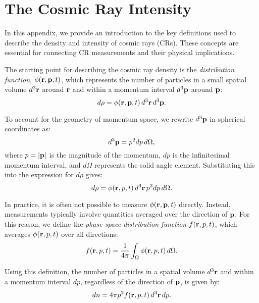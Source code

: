 \section{The Cosmic Ray Intensity}  
\label{app:intensity}

In this appendix, we provide an introduction to the key definitions used to describe the density and intensity of cosmic rays (CRs). These concepts are essential for connecting CR measurements and their physical implications.  

The starting point for describing the cosmic ray density is the \emph{distribution function}, \(\phi(\vb{r}, \vb{p}, t)\), which represents the number of particles in a small spatial volume \(d^3 \vb{r}\) around \(\vb{r}\) and within a momentum interval \(d^3 \vb{p}\) around \(\vb{p}\):  
\begin{equation}
d\rho = \phi(\vb{r}, \vb{p}, t) \, d^3 \vb{r} \, d^3 \vb{p}.
\end{equation}

To account for the geometry of momentum space, we rewrite \(d^3 \vb{p}\) in spherical coordinates as:  
\begin{equation}
d^3 \vb{p} = p^2 dp \, d\Omega,
\end{equation}
where \(p = |\vb{p}|\) is the magnitude of the momentum, \(dp\) is the infinitesimal momentum interval, and \(d\Omega\) represents the solid angle element. Substituting this into the expression for \(d\rho\) gives:  
\begin{equation}
d\rho = \phi(\vb{r}, p, t) \, d^3 \vb{r} \, p^2 dp \, d\Omega.
\end{equation}

In practice, it is often not possible to measure \(\phi(\vb{r}, \vb{p}, t)\) directly. Instead, measurements typically involve quantities averaged over the direction of \(\vb{p}\). For this reason, we define the \emph{phase-space distribution function} \(f(\vb{r}, p, t)\), which averages \(\phi(\vb{r}, p, t)\) over all directions:  
\begin{equation}
f(\vb{r}, p, t) = \frac{1}{4\pi} \int_\Omega \phi(\vb{r}, p, t) \, d\Omega.
\end{equation}

Using this definition, the number of particles in a spatial volume \(d^3 \vb{r}\) and within a momentum interval \(dp\), regardless of the direction of \(\vb{p}\), is given by:  
\begin{equation}\label{eq:dnd3p}
dn = 4\pi p^2 f(\vb{r}, p, t) \, d^3 \vb{r} \, dp.
\end{equation}

